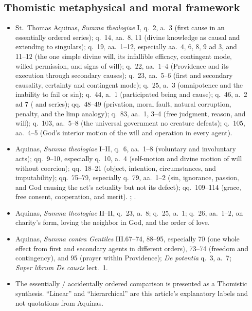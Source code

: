 \subsection*{Thomistic metaphysical and moral framework}

{\fontsize{8.6}{9.6}\selectfont
\begin{itemize}[itemsep=0pt,parsep=0pt,topsep=0.05em]
\item St.~Thomas Aquinas, \emph{Summa theologiae} I, q.~2, a.~3 (first cause in an essentially ordered series); q.~14, aa.~8, 11 (divine knowledge as causal and extending to singulars); q.~19, aa.~1--12, especially aa.~4, 6, 8, 9 ad 3, and 11--12 (the one simple divine will, its infallible efficacy, contingent mode, willed permission, and signs of will); q.~22, aa.~1--4 (Providence and its execution through secondary causes); q.~23, aa.~5--6 (first and secondary causality, certainty and contingent mode); q.~25, a.~3 (omnipotence and the inability to fail or sin); q.~44, a.~1 (participated being and cause); q.~46, a.~2 ad 7 ( and  series); qq.~48--49 (privation, moral fault, natural corruption, penalty, and the limp analogy); q.~83, aa.~1, 3--4 (free judgment, reason, and will); q.~103, aa.~5--8 (the universal government no creature defeats); q.~105, aa.~4--5 (God's interior motion of the will and operation in every agent).
\item Aquinas, \emph{Summa theologiae} I--II, q.~6, aa.~1--8 (voluntary and involuntary acts); qq.~9--10, especially q.~10, a.~4 (self-motion and divine motion of will without coercion); qq.~18--21 (object, intention, circumstances, and imputability); qq.~75--79, especially q.~79, aa.~1--2 (sin, ignorance, passion, and God causing the act's actuality but not its defect); qq.~109--114 (grace, free consent, cooperation, and merit). ; .
\item Aquinas, \emph{Summa theologiae} II--II, q.~23, a.~8; q.~25, a.~1; q.~26, aa.~1--2, on charity's form, loving the neighbor in God, and the order of love.
\item Aquinas, \emph{Summa contra Gentiles} III.67--74, 88--95, especially 70 (one whole effect from first and secondary agents in different orders), 73--74 (freedom and contingency), and 95 (prayer within Providence); \emph{De potentia} q.~3, a.~7; \emph{Super librum De causis} lect.~1.
\item The essentially / accidentally ordered comparison is presented as a Thomistic synthesis. ``Linear'' and ``hierarchical'' are this article's explanatory labels and not quotations from Aquinas.
\end{itemize}}

